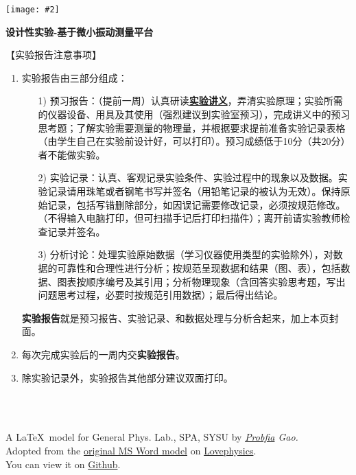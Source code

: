 \documentclass[11pt,a4paper]{ctexart}
\newcommand{\ExpeName}{设计性实验-基于微小振动测量平台}
\newcommand{\cpic}[2]{
\begin{center}
\texttt{[image: \#2]}
\end{center}
}
\begin{document}
\cpic{0.34}{e1}%
\begin{center}
\LARGE\textbf{{\ExpeName}}
\end{center}
\large{【实验报告注意事项】}
\begin{enumerate}
 \item 实验报告由三部分组成：
 \begin{enumerate}
  \item[1)]预习报告：（提前一周）认真研读\textbf{\uline{实验讲义}}，弄清实验原理；实验所需的仪器设备、用具及其使用（强烈建议到实验室预习），完成讲义中的预习思考题；了解实验需要测量的物理量，并根据要求提前准备实验记录表格（由学生自己在实验前设计好，可以打印）。预习成绩低于10分（共20分）者不能做实验。
  \item[2)]实验记录：认真、客观记录实验条件、实验过程中的现象以及数据。实验记录请用珠笔或者钢笔书写并签名（{\color{red}用铅笔记录的被认为无效}）。{\color{red}保持原始记录，包括写错删除部分，如因误记需要修改记录，必须按规范修改。}（不得输入电脑打印，但可扫描手记后打印扫描件）；离开前请实验教师检查记录并签名。
  \item[3)]分析讨论：处理实验原始数据（学习仪器使用类型的实验除外），对数据的可靠性和合理性进行分析；按规范呈现数据和结果（图、表），包括数据、图表按顺序编号及其引用；分析物理现象（含回答实验思考题，写出问题思考过程，必要时按规范引用数据）；最后得出结论。
 \end{enumerate}
 \textbf{实验报告}就是预习报告、实验记录、和数据处理与分析合起来，加上本页封面。
 \item 每次完成实验后的一周内交\textbf{实验报告}。
 \item 除实验记录外，实验报告其他部分建议双面打印。
\end{enumerate}
\ 
\\
\ 

\begin{flushright}                                                           %
\tiny{
A \LaTeX \ model for General Phys. Lab., SPA, SYSU by {\em \href{https://www.weibo.com/3532532974/profile?rightmod=1&wvr=6&mod=personinfo&is_all=1}{Probfia} Gao.}\\ Adopted from the \href{http://lovephysics.sysu.edu.cn/lib/exe/fetch.php?media=courses:secondlevelzhuhai:report.docx}{original MS Word model} on \href{http://lovephysics.sysu.edu.cn}{Lovephysics}.\\ You can view it on \href{https://github.com/Probfia/SYSU_GPL_C}{Github}.}
\end{flushright}
\end{document}
